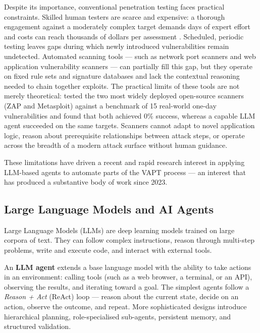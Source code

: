 Despite its importance, conventional penetration testing faces practical constraints. Skilled human testers are scarce and expensive: a thorough engagement against a moderately complex target demands days of expert effort and costs can reach thousands of dollars per assessment \citep{kong2025vulnbot}. Scheduled, periodic testing leaves gaps during which newly introduced vulnerabilities remain undetected. Automated scanning tools --- such as network port scanners and web application vulnerability scanners --- can partially fill this gap, but they operate on fixed rule sets and signature databases and lack the contextual reasoning needed to chain together exploits. The practical limits of these tools are not merely theoretical: \citet{fang2024oneday} tested the two most widely deployed open-source scanners (ZAP and Metasploit) against a benchmark of 15 real-world one-day vulnerabilities and found that both achieved 0\% success, whereas a capable LLM agent succeeded on the same targets. Scanners cannot adapt to novel application logic, reason about prerequisite relationships between attack steps, or operate across the breadth of a modern attack surface without human guidance.

These limitations have driven a recent and rapid research interest in applying LLM-based agents to automate parts of the VAPT process --- an interest that has produced a substantive body of work since 2023.

\subsection{Large Language Models and AI Agents}

Large Language Models (LLMs) are deep learning models trained on large corpora of text. They can follow complex instructions, reason through multi-step problems, write and execute code, and interact with external tools.

An \textbf{LLM agent} extends a base language model with the ability to take actions in an environment: calling tools (such as a web browser, a terminal, or an API), observing the results, and iterating toward a goal. The simplest agents follow a \emph{Reason + Act} (ReAct) loop --- reason about the current state, decide on an action, observe the outcome, and repeat. More sophisticated designs introduce hierarchical planning, role-specialised sub-agents, persistent memory, and structured validation.

